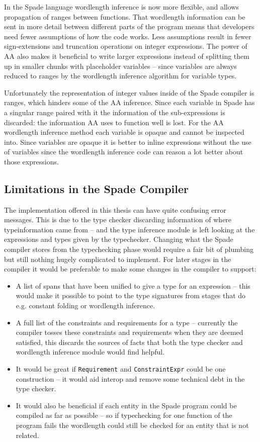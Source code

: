 In the Spade language wordlength inference is now more flexible, and allows propagation of ranges between functions. That wordlength information can be sent in more detail between different parts of the program means that developers need fewer assumptions of how the code works. Less assumptions result in fewer sign-extensions and truncation operations on integer expressions. The power of AA also makes it beneficial to write larger expressions instead of splitting them up in smaller chunks with placeholder variables -- since variables are always reduced to ranges by the wordlength inference algorithm for variable types.

Unfortunately the representation of integer values inside of the Spade compiler is ranges, which hinders some of the AA inference. Since each variable in Spade has a singular range paired with it the information of the sub-expressions is discarded: the information AA uses to function well is lost. For the AA wordlength inference method each variable is opaque and cannot be inspected into. Since variables are opaque it is better to inline expressions without the use of variables since the wordlength inference code can reason a lot better about those expressions.

\subsection{Limitations in the Spade Compiler}
The implementation offered in this thesis can have quite confusing error messages. This is due to the type checker discarding information of where typeinformation came from -- and the type inference module is left looking at the expressions and types given by the typechecker. Changing what the Spade compiler stores from the typechecking phase would require a fair bit of plumbing but still nothing hugely complicated to implement. For later stages in the compiler it would be preferable to make some changes in the compiler to support:
\begin{itemize}
  \item A list of spans that have been unified to give a type for an expression -- this would make it possible to point to the type signatures from stages that do e.g. constant folding or wordlength inference.
  \item A full list of the constraints and requirements for a type -- currently the compiler tosses these constraints and requirements when they are deemed satisfied, this discards the sources of facts that both the type checker and wordlength inference module would find helpful.
  \item It would be great if \verb+Requirement+ and \verb+ConstraintExpr+ could be one construction -- it would aid interop and remove some technical debt in the type checker.
  \item It would also be beneficial if each entity in the Spade program could be compiled as far as possible -- so if typechecking for one function of the program fails the wordlength could still be checked for an entity that is not related.
\end{itemize}

